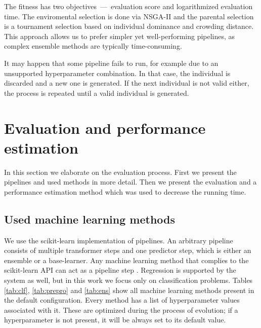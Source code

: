 The fitness has two objectives~---~evaluation score and logarithmized
evaluation time. The enviromental selection is done via NSGA-II and the 
parental selection is a tournament selection based on individual dominance and 
crowding distance. This approach allows us to prefer simpler yet
well-performing pipelines, as complex ensemble methods are typically
time-consuming. 

It may happen that some pipeline fails to run, for example due to an
unsupported hyperparameter combination. In that case, the individual is
discarded and a new one is generated. If the next individual is not valid
either, the process is repeated until a valid individual is generated.

\section{Evaluation and performance estimation} \label{genens:eval}
In this section we elaborate on the evaluation process. First we present the
pipelines and used methods in more detail. Then we present the evaluation and
a performance estimation method which was used to decrease the running time.

\subsection{Used machine learning methods} \label{tab03:methods}
We use the scikit-learn implementation of pipelines. An arbitrary pipeline
consists of multiple transformer steps and one predictor step, which is either
an ensemble or a base-learner. Any machine learning method that complies to the
scikit-learn API can act as a pipeline step \citep{sklearn_api}. Regression is
supported by the system as well, but in this work we focus only on
classification problems. Tables \ref{tab:clf}, \ref{tab:prepro} and
\ref{tab:ens} show all machine learning methods present in the default
configuration. Every method has a list of hyperparameter values associated
with it. These are optimized during the process of evolution;
if a hyperparameter is not present, it will be always set to its default value.


